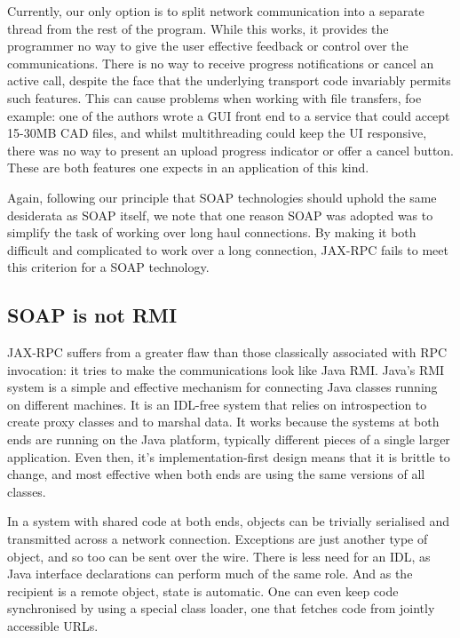 Currently, our only option is to split network communication into a
separate thread from the rest of the program. While this works, it
provides the programmer no way to give the user effective feedback or
control over the communications. There is no way to receive progress
notifications or cancel an active call, despite the face that the
underlying transport code invariably permits such features. This can
cause problems when working with file transfers, foe example: one of
the authors wrote a GUI front end to a service that could accept
15-30MB CAD files, and whilst multithreading could keep the UI
responsive, there was no way to present an upload progress indicator
or offer a cancel button. These are both features one expects in an
application of this kind.

Again, following our principle that SOAP technologies should uphold
the same desiderata as SOAP itself, we note that one reason SOAP was
adopted was to simplify the task of working over long haul
connections. By making it both difficult and complicated to work over
a long connection, JAX-RPC fails to meet this criterion for a SOAP
technology.

\subsection{SOAP is not RMI}
\label{objections:soap-not-rmi}

JAX-RPC suffers from a greater flaw than those classically associated
with RPC invocation: it tries to make the communications look like
Java RMI. Java's RMI system is a simple and effective mechanism for
connecting Java classes running on different machines. It is an
IDL-free system that relies on introspection to
create proxy classes and to marshal data. It works because the
systems at both ends are running on the Java platform, typically
different pieces of a single larger application. Even then, it's
implementation-first design means that it is brittle to change, and
most effective when both ends are using the same versions of all
classes.

In a system with shared code at both ends, objects can be trivially serialised
and transmitted across a network connection. Exceptions are just another type of
object, and so too can be sent over the wire. There is less need for an IDL, as
Java interface declarations can perform much of the same role. And as the
recipient is a remote object, state is automatic. One can even keep code
synchronised by using a special class loader, one that fetches code from jointly
accessible URLs.

